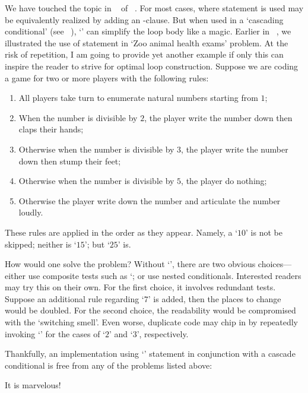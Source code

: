 We have touched the topic in ~ of ~.
For most cases, where  statement is used may be
equivalently realized by adding an -clause.
But when used in a `cascading conditional' (see ~),
`' can simplify the loop body like a magic.
Earlier in ~, we illustrated the use of  statement in
`Zoo animal health exams' problem.
At the risk of repetition, I am going to provide yet another example if only this can inspire the
reader to strive for optimal loop construction.
Suppose we are coding a game for two or more players with the following rules:
\begin{enumerate}
    \item All players take turn to enumerate natural numbers starting from $1$;
    \item When the number is divisible by $2$, the player write the number down then claps their
    hands;
    \item Otherwise when the number is divisible by $3$, the player write the number down then
    stump their feet;
    \item Otherwise when the number is divisible by $5$, the player do nothing;
    \item Otherwise the player write down the number and articulate the number loudly.
\end{enumerate}
These rules are applied in the order as they appear.
Namely, a `$10$' is not be skipped;
neither is `$15$';
but `$25$' is.

How would one solve the problem?
Without `', there are two obvious choices---either use composite tests such as
`; or use nested conditionals.
Interested readers may try this on their own.
For the first choice, it involves redundant tests.
Suppose an additional rule regarding `$7$' is added, then the places to change would be doubled.
For the second choice, the readability would be compromised with the `switching
smell'\cite{Fowler1999}.
Even worse, duplicate code may chip in by repeatedly invoking `' for the
cases of `$2$' and `$3$', respectively.


Thankfully, an implementation using `' statement in conjunction
with a cascade conditional is free from any of the problems listed above:

It is marvelous!

